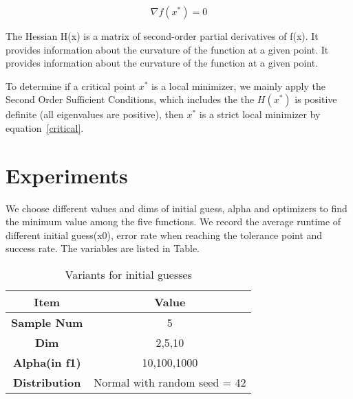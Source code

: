 \documentclass[12pt]{article}
\begin{document}
\begin{equation}
\nabla f(x^*) = 0
\label{critical}
\end{equation}

The Hessian H(x) is a matrix of second-order partial derivatives of f(x). It provides information about the curvature of the function at a given point. It provides information about the curvature of the function at a given point.

To determine if a critical point $x^*$ is a local minimizer, we mainly apply the Second Order Sufficient Conditions, which includes the the $H(x^*)$ is positive definite (all eigenvalues are positive), then $x^*$ is a strict local minimizer by equation~\ref{critical}.






\section{Experiments}


We choose different values and dims of initial guess, alpha and optimizers to find the minimum value among the five functions. We record the average runtime of different initial guess(x0), error rate when reaching the tolerance point and success rate. The variables are listed in Table. %

\begin{table}[h!]
\label{table:rule}
\centering
\begin{tabular}{cc}
\toprule
 \textbf{Item} & \textbf{Value} \\ 
\midrule
\textbf{Sample Num} & 5 \\
\textbf{Dim} & 2,5,10 \\
\textbf{Alpha(in f1)} & 10,100,1000 \\
\textbf{Distribution} & Normal with random seed = 42 \\
\bottomrule
\end{tabular}
\caption{Variants for initial guesses}
\end{table}
\end{document}
